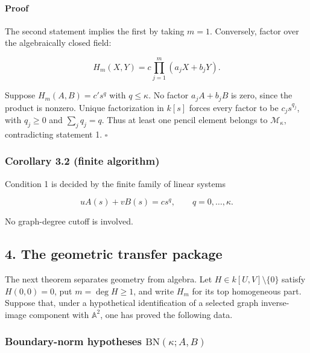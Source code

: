 \documentclass[
  11pt,
  a4paper,
]{article}
\begin{document}
\paragraph{Proof}\label{proof-1}

The second statement implies the first by taking \(m=1\). Conversely,
factor over the algebraically closed field:

\[
H_m(X,Y)=c\prod_{j=1}^m(a_jX+b_jY).
\]

Suppose \(H_m(A,B)=c's^q\) with \(q\le\kappa\). No factor \(a_jA+b_jB\)
is zero, since the product is nonzero. Unique factorization in \(k[s]\)
forces every factor to be \(c_js^{q_j}\), with \(q_j\ge0\) and
\(\sum_jq_j=q\). Thus at least one pencil element belongs to
\(\mathcal M_\kappa\), contradicting statement 1. \(\square\)

\subsubsection{Corollary 3.2 (finite
algorithm)}\label{corollary-3.2-finite-algorithm}

Condition 1 is decided by the finite family of linear systems

\[
uA(s)+vB(s)=cs^q,
\qquad q=0,\ldots,\kappa.
\tag{3.2}
\]

No graph-degree cutoff is involved.

\subsection{4. The geometric transfer
package}\label{the-geometric-transfer-package}

The next theorem separates geometry from algebra. Let
\(H\in k[U,V]\setminus\{0\}\) satisfy \(H(0,0)=0\), put
\(m=\deg H\ge1\), and write \(H_m\) for its top homogeneous part.
Suppose that, under a hypothetical identification of a selected graph
inverse-image component with \(\mathbb A^2\), one has proved the
following data.

\subsubsection{\texorpdfstring{Boundary-norm hypotheses
\(\mathrm{BN}(\kappa;A,B)\)}{Boundary-norm hypotheses \textbackslash mathrm\{BN\}(\textbackslash kappa;A,B)}}\label{boundary-norm-hypotheses-mathrmbnkappaab}
\end{document}
